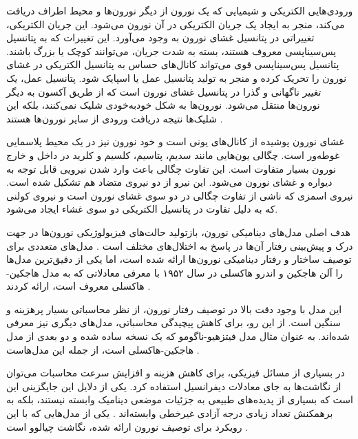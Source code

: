 ورودی‌هایی الکتریکی و شیمیایی که یک نورون از دیگر نورون‌ها و محیط اطراف دریافت می‌کند، منجر به ایجاد یک جریان الکتریکی در آن نورون می‌شود.
این جریان الکتریکی، تغییراتی در پتانسیل غشای نورون به وجود می‌آورد.
این تغییرات که به پتانسیل پس‌سیناپسی معروف هستند، بسته به شدت جریان، می‌توانند کوچک یا بزرگ باشند.
پتانسیل پس‌سیناپسی قوی می‌تواند کانال‌های حساس به پتانسیل الکتریکی در غشای نورون را تحریک کرده و منجر به تولید پتانسیل عمل یا اسپایک شود.
پتانسیل عمل، یک تغییر ناگهانی و گذرا در پتانسیل غشای نورون است که از طریق آکسون به دیگر نورون‌ها منتقل می‌شود.
نورون‌ها به شکل خودبه‌خودی شلیک نمی‌کنند، بلکه این شلیک‌ها نتیجه دریافت ورودی از سایر نورون‌ها هستند
\cite{izhikevich2006}.

غشای نورون پوشیده از کانال‌های یونی است و خود نورون نیز در یک محیط پلاسمایی غوطه‌ور است.
چگالی یون‌هایی مانند سدیم، پتاسیم، کلسیم و کلرید در داخل و خارج نورون بسیار متفاوت است.
این تفاوت چگالی باعث وارد شدن نیرویی قابل توجه به دیواره و غشای نورون می‌شود.
این نیرو از دو نیروی متضاد هم تشکیل شده است.
نیروی اسمزی که ناشی از تفاوت چگالی در دو سوی غشای نورون است و نیروی کولنی که به دلیل تفاوت در پتانسیل الکتریکی دو سوی غشاء ایجاد می‌شود.

هدف اصلی مدل‌های دینامیکی نورون، بازتولید حالت‌های فیزیولوژیکی نورون‌ها در جهت درک و پیش‌بینی رفتار آن‌ها در پاسخ به اختلال‌های مختلف است
\cite{chialvo1995}.
مدل‌های متعددی برای توصیف ساختار و رفتار دینامیکی نورون‌ها ارائه شده است، اما یکی از دقیق‌ترین مدل‌ها را آلن هاجکین و اندرو هاکسلی در سال ۱۹۵۲ با معرفی معادلاتی که به مدل هاجکین-هاکسلی معروف است، ارائه کردند
\cite{hodgkin1952}.

این مدل با وجود دقت بالا در توصیف رفتار نورون، از نظر محاسباتی بسیار پرهزینه و سنگین است.
از این رو، برای کاهش پیچیدگی محاسباتی، مدل‌های دیگری نیز معرفی شده‌اند.
به عنوان مثال مدل فیتزهیو-ناگومو که یک نسخه ساده شده و دو بعدی از مدل هاجکین-هاکسلی است، از جمله این مدل‌هاست
\cite{fitzhugh1961,nagumo1962,dayan2001,graben2008}.

در بسیاری از مسائل فیزیکی، برای کاهش هزینه و افزایش سرعت محاسبات می‌توان از نگاشت‌ها به جای معادلات دیفرانسیل استفاده کرد.
یکی از دلایل این جایگزینی این است که بسیاری از پدیده‌های طبیعی به جزئیات موضعی دینامیک وابسته نیستند، بلکه به برهمکنش تعداد زیادی درجه آزادی غیرخطی وابسته‌اند
\cite{kaneko1992}.
یکی از مدل‌هایی که با این رویکرد برای توصیف نورون ارائه شده، نگاشت چیالوو است
\cite{chialvo1995,girardi-schappo2013}.

